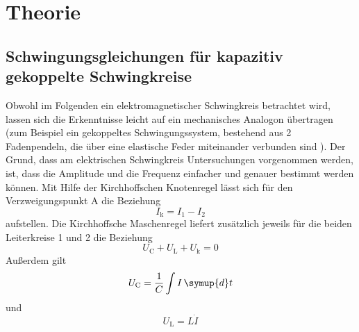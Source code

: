 \section{Theorie}
\label{sec:Theorie}

\subsection{Schwingungsgleichungen für kapazitiv gekoppelte Schwingkreise}

Obwohl im Folgenden ein elektromagnetischer Schwingkreis betrachtet wird, lassen sich die Erkenntnisse leicht auf ein mechanisches Analogon übertragen
(zum Beispiel ein gekoppeltes Schwingungssystem, bestehend aus 2 Fadenpendeln, die über eine elastische Feder miteinander verbunden sind 
\cite{v355}). Der Grund, dass am elektrischen Schwingkreis Untersuchungen vorgenommen werden, ist, dass die Amplitude und die Frequenz
einfacher und genauer bestimmt werden können.
\newline
Mit Hilfe der Kirchhoffschen Knotenregel lässt sich für den Verzweigungspunkt A die Beziehung
\begin{equation}
    I_\text{k} = I_1 - I_2
    \label{eqn:Knotenregel}
\end{equation}
aufstellen.
\newline
Die Kirchhoffsche Maschenregel liefert zusätzlich jeweils für die beiden Leiterkreise 1 und 2 die Beziehung
\begin{equation}
    U_\text{C} + U_{\text{L}} + U_{\text{k}} = 0
    \label{eqn:Maschenregel}
\end{equation}
Außerdem gilt
\begin{equation}
    U_\text{C} = \frac{1}{C} \int I \, \symup{d}t
\end{equation}
  und
\begin{equation}
    U_\text{L} = L \dot{I}
\end{equation}

